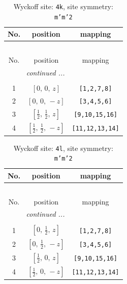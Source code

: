 \documentclass[fleqn,8pt]{jsarticle}
\begin{document}
\renewcommand{\arraystretch}{1.2}
\begin{longtable}{ccc}
\caption{Wyckoff site: {\tt 4k}, site symmetry: {\tt m'm'2}}
 \\
 \hline \hline
No. & position & mapping \\ \hline \endfirsthead

\multicolumn{2}{l}{\tablename\ \thetable{}} \\
 \hline \hline
No. & position & mapping \\ \hline \endhead

 \hline \hline
\multicolumn{2}{r}{\footnotesize\it continued ...} \\ \endfoot

 \hline \hline
\multicolumn{2}{r}{} \\ \endlastfoot

1 & $\left[ 0,\, 0,\, z \right]$ & {\tt [1,2,7,8]} \\ \hline
2 & $\left[ 0,\, 0,\, - z \right]$ & {\tt [3,4,5,6]} \\ \hline
3 & $\left[ \frac{1}{2},\, \frac{1}{2},\, z \right]$ & {\tt [9,10,15,16]} \\ \hline
4 & $\left[ \frac{1}{2},\, \frac{1}{2},\, - z \right]$ & {\tt [11,12,13,14]} \\
\end{longtable}
\renewcommand{\arraystretch}{1.2}
\begin{longtable}{ccc}
\caption{Wyckoff site: {\tt 4l}, site symmetry: {\tt m'm'2}}
 \\
 \hline \hline
No. & position & mapping \\ \hline \endfirsthead

\multicolumn{2}{l}{\tablename\ \thetable{}} \\
 \hline \hline
No. & position & mapping \\ \hline \endhead

 \hline \hline
\multicolumn{2}{r}{\footnotesize\it continued ...} \\ \endfoot

 \hline \hline
\multicolumn{2}{r}{} \\ \endlastfoot

1 & $\left[ 0,\, \frac{1}{2},\, z \right]$ & {\tt [1,2,7,8]} \\ \hline
2 & $\left[ 0,\, \frac{1}{2},\, - z \right]$ & {\tt [3,4,5,6]} \\ \hline
3 & $\left[ \frac{1}{2},\, 0,\, z \right]$ & {\tt [9,10,15,16]} \\ \hline
4 & $\left[ \frac{1}{2},\, 0,\, - z \right]$ & {\tt [11,12,13,14]} \\
\end{longtable}
\end{document}
